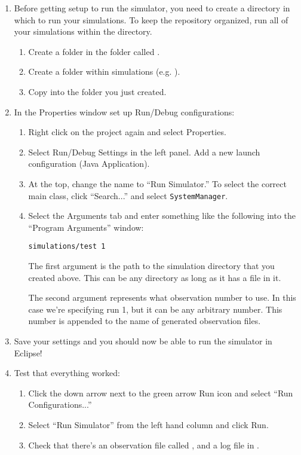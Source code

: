 \documentclass[11pt]{article}
\begin{document}
\begin{enumerate}
\item Before getting setup to run the simulator, you need to create a directory in which to run your simulations.  To keep the repository organized, run all of your simulations within the  directory.
  \begin{enumerate}
  \item Create a folder in the  folder called .
  \item Create a folder within simulations (e.g. ).
  \item Copy  into the folder you just created.
  \end{enumerate}

\item In the Properties window set up Run/Debug configurations:
  \begin{enumerate}
  \item Right click on the project again and select Properties.
  \item Select Run/Debug Settings in the left panel. Add a new launch configuration (Java Application).
  \item At the top, change the name to ``Run Simulator.'' To select the
    correct main class, click ``Search...'' and select \texttt{SystemManager}.
  \item Select the Arguments tab and enter something like the following into the ``Program Arguments'' window:

\begin{verbatim}
simulations/test 1
\end{verbatim}

The first argument is the path to the simulation directory that you created above.  This can be any directory as long as it has a
 file in it.

The second argument represents what observation number to use. In this case we're specifying run 1, but it can be any arbitrary number. This number is appended to the name of generated observation files.
  \end{enumerate}
  
\item Save your settings and you should now be able to run the simulator in Eclipse!

\item Test that everything worked:
  \begin{enumerate}
  \item Click the down arrow next to the green arrow Run icon and select ``Run
    Configurations...''
  \item Select ``Run Simulator'' from the left hand column and click Run.
  \item Check that there's an observation file called
    , and a log file in
    .
  \end{enumerate}

\end{enumerate}
\end{document}
